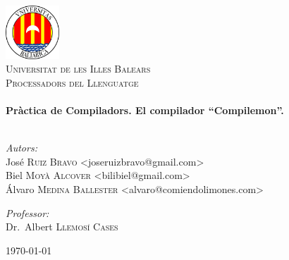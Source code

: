 \begin{titlepage}

\begin{center}


\includegraphics[width=0.15\textwidth]{logo}\\[1cm]    

\textsc{\LARGE Universitat de les Illes Balears}\\[1.5cm]

\textsc{\Large Processadors del Llenguatge}\\[0.5cm]


\HRule \\[0.4cm]
{ \huge \bfseries Pràctica de Compiladors. El compilador ``Compilemon''.}\\[0.4cm]

\HRule \\[1.5cm]

\begin{minipage}{0.4\textwidth}
\begin{flushleft} \large
\emph{Autors:}\\
\small José \textsc{Ruiz Bravo} <joseruizbravo@gmail.com>\\
\small Biel \textsc{Moyà Alcover}  <bilibiel@gmail.com>\\
\small Álvaro \textsc{Medina Ballester}  <alvaro@comiendolimones.com>\\
\end{flushleft}
\end{minipage}
\begin{minipage}{0.4\textwidth}
\begin{flushright} \large
\emph{Professor:} \\
Dr.~Albert \textsc{Llemosí Cases}
\end{flushright}
\end{minipage}

\vfill

{\large \today}

\end{center}

\end{titlepage}

